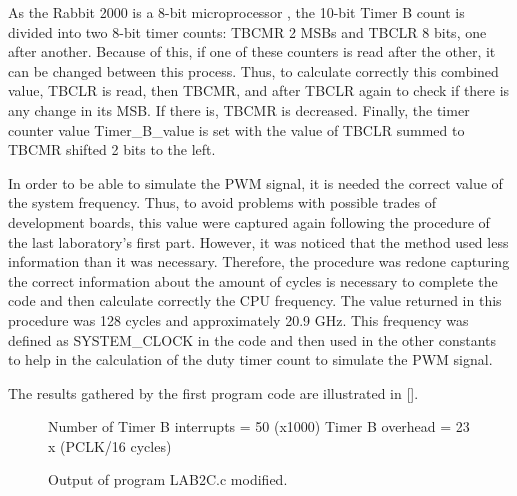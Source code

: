 As the Rabbit 2000 is a 8-bit microprocessor \cite{Digi_International_2007}, the 10-bit Timer B count is divided into two 8-bit timer counts: TBCMR 2 MSBs and TBCLR 8 bits, one after another. Because of this, if one of these counters is read after the other, it can be changed between this process. Thus, to calculate correctly this combined value, TBCLR is read, then TBCMR, and after TBCLR again to check if there is any change in its MSB. If there is, TBCMR is decreased. Finally, the timer counter value Timer\_B\_value is set with the value of TBCLR summed to TBCMR shifted 2 bits to the left. 

In order to be able to simulate the PWM signal, it is needed the correct value of the system frequency. Thus, to avoid problems with possible trades of development boards, this value were captured again following the procedure of the last laboratory's first part. However, it was noticed that the method used less information than it was necessary. Therefore, the procedure was redone capturing the correct information about the amount of cycles is necessary to complete the code and then calculate correctly the CPU frequency. The value returned in this procedure was 128 cycles and approximately 20.9 GHz. This frequency was defined as SYSTEM\_CLOCK in the code and then used in the other constants to help in the calculation of the duty timer count to simulate the PWM signal.

The results gathered by the first program code are illustrated in [].

\begin{figure}[!ht]
  \caption{Output of program LAB2C.c modified.}
  \centering
     Number of Timer B interrupts = 50 (x1000)
     Timer B overhead = 23 x (PCLK/16 cycles)
\end{figure}
